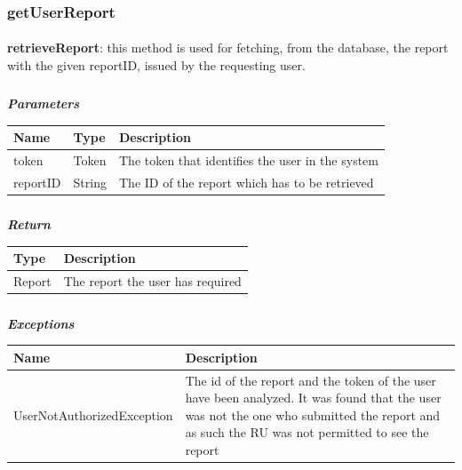 				\subsubsection{getUserReport}
					\paragraph{}
							\textbf{retrieveReport}: this method is used for fetching, from the database, the report with the given reportID, issued by the requesting user.
							\subparagraph{}
							\textit{\textbf{Parameters}}
								\begin{table}[!h]
									\begin{tabular}{L{0.2\textwidth}L{0.2\textwidth}L{0.2\textwidth}}
										\toprule
										Name & Type & Description \\
										\midrule
								  		token & Token & The token that identifies the user in the system \\
								  		reportID & String & The ID of the report which has to be retrieved \\
								 		\bottomrule
									\end{tabular}
								\end{table}
							\subparagraph{}
								\textit{\textbf{Return}}
									\begin{table}[!h]
									\begin{tabular}{L{0.3\textwidth}L{0.3\textwidth}}
										\toprule
										Type & Description \\
										\midrule
								  		Report & The report the user has required \\
								 		\bottomrule
									\end{tabular}
								\end{table}
							\subparagraph{}
								\textit{\textbf{Exceptions}}
									\begin{table}[!h]
									\begin{tabular}{L{0.3\textwidth}L{0.3\textwidth}}
										\toprule
										Name & Description \\
										\midrule
								  	UserNotAuthorizedException & The id of the report and the token of the user have been analyzed. It was found that the user was not the one who submitted the report and as such the RU was not permitted to see the report  \\
								 		\bottomrule
									\end{tabular}
								\end{table}
								
								